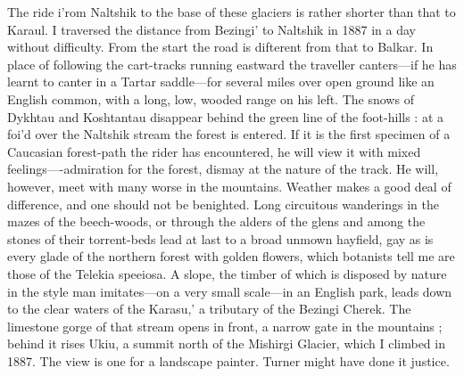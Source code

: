 \documentclass[25pt, a4paper]{article}
\begin{document}
	The ride i'rom Naltshik to the base of these glaciers is rather shorter than that to Karaul. I traversed the distance from Bezingi' to Naltshik in 1887 in a day without difficulty. From the start the road is difterent from that to Balkar. In place of following the cart-tracks running eastward the traveller canters—if he has learnt to canter in a Tartar saddle—for several miles over open ground like an English common, with a long, low, wooded range on his left. The snows of Dykhtau and Koshtantau disappear behind the green line of the foot-hills : at a foi'd over the Naltshik stream the forest is entered. If it is the first specimen of a Caucasian forest-path the rider has encountered, he will view it with mixed feelings—-admiration for the forest, dismay at the nature of the track. He will, however, meet with many worse in the mountains. Weather makes a good deal of difference, and one should not be benighted. Long circuitous wanderings in the mazes of the beech-woods, or through the alders of the glens and among the stones of their torrent-beds lead at last to a broad unmown hayfield, gay as is every glade of the northern forest with golden flowers, which botanists tell me are those of the Telekia speeiosa. A slope, the timber of which is disposed by nature in the style man imitates—on a very small scale—in an English park, leads down to the clear waters of the Karasu,' a tributary of the Bezingi Cherek. The limestone gorge of that stream opens in front, a narrow gate in the mountains ; behind it rises Ukiu, a summit north of the Mishirgi Glacier, which I climbed in 1887. The view is one for a landscape painter. Turner might have done it justice.
	
\end{document}
